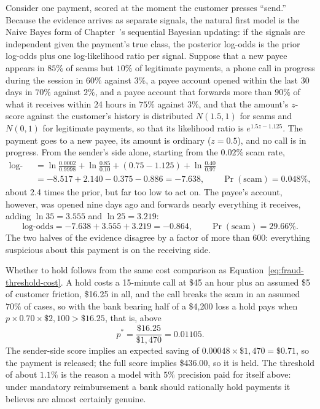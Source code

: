 \documentclass[../ai_in_finance]{subfiles}
\begin{document}
Consider one payment, scored at the moment the customer presses ``send.'' Because the evidence arrives as separate signals, the natural first model is the Naive Bayes form of Chapter~'s sequential Bayesian updating: if the signals are independent given the payment's true class, the posterior log-odds is the prior log-odds plus one log-likelihood ratio per signal. Suppose that a new payee appears in $85\%$ of scams but $10\%$ of legitimate payments, a phone call in progress during the session in $60\%$ against $3\%$, a payee account opened within the last 30 days in $70\%$ against $2\%$, and a payee account that forwards more than $90\%$ of what it receives within 24 hours in $75\%$ against $3\%$, and that the amount's $z$-score against the customer's history is distributed $N(1.5,1)$ for scams and $N(0,1)$ for legitimate payments, so that its likelihood ratio is $e^{1.5z-1.125}$. The payment goes to a new payee, its amount is ordinary ($z=0.5$), and no call is in progress. From the sender's side alone, starting from the $0.02\%$ scam rate,
\begin{align*}
\text{log-odds} &= \ln\tfrac{0.0002}{0.9998} + \ln\tfrac{0.85}{0.10} + (0.75 - 1.125) + \ln\tfrac{0.40}{0.97} \\
&= -8.517 + 2.140 - 0.375 - 0.886 = -7.638, \qquad \Pr(\text{scam}) = 0.048\%,
\end{align*}
about 2.4 times the prior, but far too low to act on. The payee's account, however, was opened nine days ago and forwards nearly everything it receives, adding $\ln 35 = 3.555$ and $\ln 25 = 3.219$:
\begin{equation*}
\text{log-odds} = -7.638 + 3.555 + 3.219 = -0.864, \qquad \Pr(\text{scam}) = 29.66\%.
\end{equation*}
The two halves of the evidence disagree by a factor of more than 600: everything suspicious about this payment is on the receiving side.

Whether to hold follows from the same cost comparison as Equation~\eqref{eq:fraud-threshold-cost}. A hold costs a 15-minute call at \$45 an hour plus an assumed \$5 of customer friction, \$16.25 in all, and the call breaks the scam in an assumed $70\%$ of cases, so with the bank bearing half of a \$4,200 loss a hold pays when $p \times 0.70 \times \$2{,}100 > \$16.25$, that is, above
\begin{equation*}
p^{*} = \frac{\$16.25}{\$1{,}470} = 0.01105.
\end{equation*}
The sender-side score implies an expected saving of $0.00048 \times \$1{,}470 = \$0.71$, so the payment is released; the full score implies \$436.00, so it is held. The threshold of about $1.1\%$ is the reason a model with $5\%$ precision paid for itself above: under mandatory reimbursement a bank should rationally hold payments it believes are almost certainly genuine.
\end{document}
